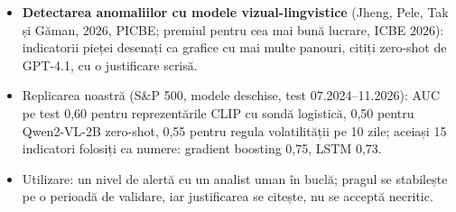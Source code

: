 \begin{itemize}\setlength{\itemsep}{2pt}
  \item \textbf{Detectarea anomaliilor cu modele vizual-lingvistice} (Jheng, Pele, Tak și Găman, 2026, PICBE; premiul pentru cea mai bună lucrare, ICBE 2026): indicatorii pieței desenați ca grafice cu mai multe panouri, citiți zero-shot de GPT-4.1, cu o justificare scrisă.
  \item Replicarea noastră (S\&P 500, modele deschise, test 07.2024--11.2026): AUC pe test 0,60 pentru reprezentările CLIP cu sondă logistică, 0,50 pentru Qwen2-VL-2B zero-shot, 0,55 pentru regula volatilității pe 10 zile; aceiași 15 indicatori folosiți ca numere: gradient boosting 0,75, LSTM 0,73.
  \item Utilizare: un nivel de alertă cu un analist uman în buclă; pragul se stabilește pe o perioadă de validare, iar justificarea se citește, nu se acceptă necritic.
\end{itemize}
